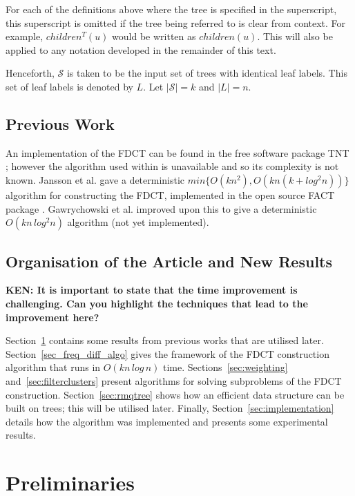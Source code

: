 \documentclass[final,1p,times]{elsarticle}
\begin{document}
    For each of the definitions above where the tree is specified in the superscript, this superscript is omitted if the tree being referred to is clear from context. For example, $children^T(u)$ would be written as $children(u)$. This will also be applied to any notation developed in the remainder of this text.

    Henceforth, $\mathcal{S}$ is taken to be the input set of trees with identical leaf labels. This set of leaf labels is denoted by $L$. Let $|\mathcal{S}| = k$ and $|L| = n$.

    \subsection{Previous Work}
    \label{subsec:previouswork}

    An implementation of the FDCT can be found in the free software package TNT \cite{goloboff2008tnt}; however the algorithm used within is unavailable and so its complexity is not known. Jansson et al. \cite{jansson2018algorithms} gave a deterministic $min\{O(kn^2), O(kn(k + log^2 n))\}$ algorithm for constructing the FDCT, implemented in the open source FACT package \cite{jansson2016improved}. Gawrychowski et al. \cite{gawrychowski2017faster} improved upon this to give a deterministic $O(kn\,log^2n)$ algorithm (not yet implemented).

    \subsection{Organisation of the Article and New Results}

    {\bf KEN: It is important to state that the time improvement is challenging. Can you highlight the techniques that lead to the improvement here?}

    Section~\ref{sec:preliminaries} contains some results from previous works that are utilised later.
    Section~\ref{sec_freq_diff_algo} gives the framework of the FDCT construction algorithm that runs in $O(kn\,log\,n)$ time.
    Sections~\ref{sec:weighting} and~\ref{sec:filterclusters} present algorithms for solving subproblems of the FDCT construction.
    Section~\ref{sec:rmqtree} shows how an efficient data structure can be built on trees; this will be utilised later.
    Finally, Section~\ref{sec:implementation} details how the algorithm was implemented and presents some experimental results.

    \section{Preliminaries}
    \label{sec:preliminaries}
\end{document}
